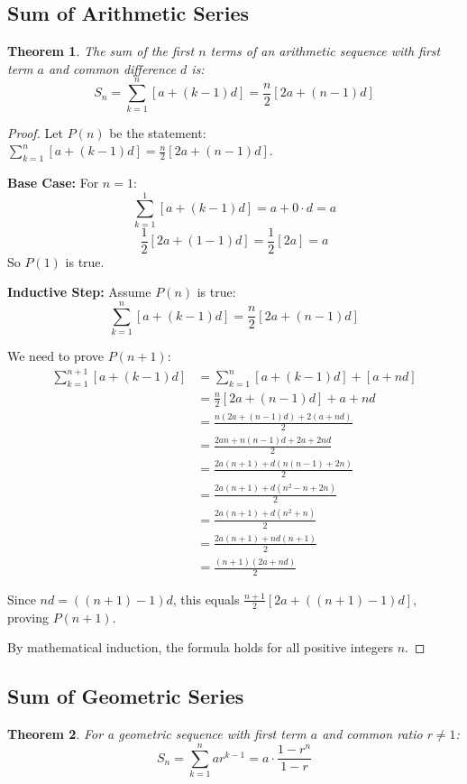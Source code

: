 \documentclass[12pt]{article}
\newtheorem{theorem}{Theorem}
\begin{document}
\subsection{Sum of Arithmetic Series}

\begin{theorem}
The sum of the first $n$ terms of an arithmetic sequence with first term $a$ and common difference $d$ is:
$$S_n = \sum_{k=1}^{n} [a + (k-1)d] = \frac{n}{2}[2a + (n-1)d]$$
\end{theorem}

\begin{proof}
Let $P(n)$ be the statement: $\sum_{k=1}^{n} [a + (k-1)d] = \frac{n}{2}[2a + (n-1)d]$.

\textbf{Base Case:} For $n = 1$:
$$\sum_{k=1}^{1} [a + (k-1)d] = a + 0 \cdot d = a$$
$$\frac{1}{2}[2a + (1-1)d] = \frac{1}{2}[2a] = a$$
So $P(1)$ is true.

\textbf{Inductive Step:} Assume $P(n)$ is true:
$$\sum_{k=1}^{n} [a + (k-1)d] = \frac{n}{2}[2a + (n-1)d]$$

We need to prove $P(n+1)$:
\begin{align}
\sum_{k=1}^{n+1} [a + (k-1)d] &= \sum_{k=1}^{n} [a + (k-1)d] + [a + nd] \\
&= \frac{n}{2}[2a + (n-1)d] + a + nd \\
&= \frac{n(2a + (n-1)d) + 2(a + nd)}{2} \\
&= \frac{2an + n(n-1)d + 2a + 2nd}{2} \\
&= \frac{2a(n+1) + d(n(n-1) + 2n)}{2} \\
&= \frac{2a(n+1) + d(n^2-n+2n)}{2} \\
&= \frac{2a(n+1) + d(n^2+n)}{2} \\
&= \frac{2a(n+1) + nd(n+1)}{2} \\
&= \frac{(n+1)(2a + nd)}{2}
\end{align}

Since $nd = ((n+1)-1)d$, this equals $\frac{n+1}{2}[2a + ((n+1)-1)d]$, proving $P(n+1)$.

By mathematical induction, the formula holds for all positive integers $n$.
\end{proof}

\subsection{Sum of Geometric Series}

\begin{theorem}
For a geometric sequence with first term $a$ and common ratio $r \neq 1$:
$$S_n = \sum_{k=1}^{n} ar^{k-1} = a \cdot \frac{1-r^n}{1-r}$$
\end{theorem}
\end{document}
